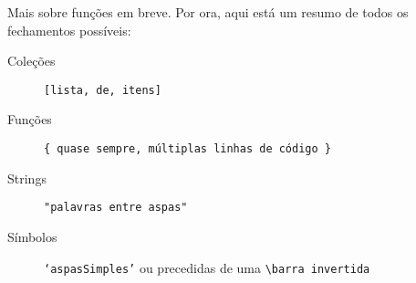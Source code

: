 Mais sobre funções em breve. Por ora, aqui está um resumo de todos os fechamentos possíveis:

\begin{description}
\item[Coleções] \texttt{[lista, de, itens]}
\item[Funções] \texttt{\{ quase sempre, múltiplas linhas de código \}}
\item[Strings] \texttt{"palavras entre aspas"}
\item[Símbolos] \texttt{‘aspasSimples’} ou precedidas de uma \texttt{\textbackslash barra invertida}
\end{description}
